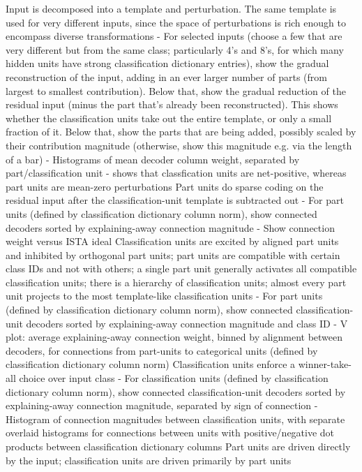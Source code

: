 Input is decomposed into a template and perturbation.  The same template is used for very different inputs, since the space of perturbations is rich enough to encompass diverse transformations
  - For selected inputs (choose a few that are very different but from the same class; particularly 4's and 8's, for which many hidden units have strong classification dictionary entries), show the gradual reconstruction of the input, adding in an ever larger number of parts (from largest to smallest contribution).  Below that, show the gradual reduction of the residual input (minus the part that's already been reconstructed).  This shows whether the classification units take out the entire template, or only a small fraction of it.  Below that, show the parts that are being added, possibly scaled by their contribution magnitude (otherwise, show this magnitude e.g. via the length of a bar)
  - Histograms of mean decoder column weight, separated by part/classification unit - shows that classfication units are net-positive, whereas part units are mean-zero perturbations
Part units do sparse coding on the residual input after the classification-unit template is subtracted out
  - For part units (defined by classification dictionary column norm), show connected decoders sorted by explaining-away connection magnitude
  - Show connection weight versus ISTA ideal
Classification units are excited by aligned part units and inhibited by orthogonal part units; part units are compatible with certain class IDs and not with others; a single part unit generally activates all compatible classification units; there is a hierarchy of classification units; almost every part unit projects to the most template-like classification units
  - For part units (defined by classification dictionary column norm), show connected classification-unit decoders sorted by explaining-away connection magnitude and class ID
  - V plot: average explaining-away connection weight, binned by alignment between decoders, for connections from part-units to categorical units (defined by classification dictionary column norm)
Classification units enforce a winner-take-all choice over input class
  - For classification units (defined by classification dictionary column norm), show connected classification-unit decoders sorted by explaining-away connection magnitude, separated by sign of connection 
  - Histogram of connection magnitudes between classification units, with separate overlaid histograms for connections between units with positive/negative dot products between classification dictionary columns
Part units are driven directly by the input; classification units are driven primarily by part units
